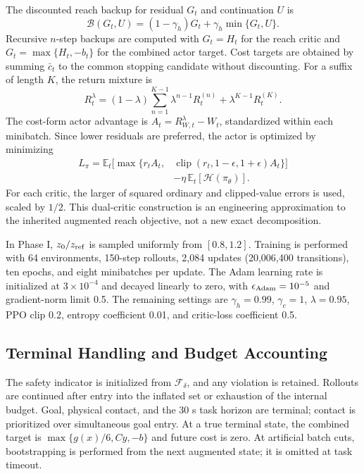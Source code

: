 \documentclass[conference]{IEEEtran}
\begin{document}
The discounted reach backup for residual $G_t$ and continuation $U$ is
\begin{equation}
\mathcal{B}(G_t,U)=(1-\gamma_h)G_t+
\gamma_h\min\{G_t,U\}.
\end{equation}
Recursive $n$-step backups are computed with $G_t=H_t$ for the reach critic and
$G_t=\max\{H_t,-b_t\}$ for the combined actor target. Cost targets are obtained by
summing $\bar c_t$ to the common stopping candidate without discounting. For a
suffix of length $K$, the return mixture is
\begin{equation}
R_t^\lambda=(1-\lambda)\sum_{n=1}^{K-1}\lambda^{n-1}R_t^{(n)}
+\lambda^{K-1}R_t^{(K)}.
\end{equation}
The cost-form actor advantage is $A_t=R_{W,t}^\lambda-W_t$, standardized
within each minibatch. Since lower residuals are preferred, the actor is optimized by minimizing
\begin{equation}
\begin{split}
L_\pi=\mathbb{E}_t\big[\max\{r_t A_t,&
\operatorname{clip}(r_t,1-\epsilon,1+\epsilon)A_t\}\big]\\
&-\eta\,\mathbb{E}_t[\mathcal H(\pi_\theta)] .
\end{split}
\end{equation}
For each critic, the larger of squared ordinary and clipped-value errors is used,
scaled by $1/2$. This dual-critic construction is an engineering approximation
to the inherited augmented reach objective, not a new exact decomposition.

In Phase I, $z_0/z_{\rm ref}$ is sampled uniformly from $[0.8,1.2]$.
Training is performed with 64 environments, 150-step rollouts, 2,084 updates
(20,006,400 transitions), ten epochs, and eight minibatches per update.
The Adam learning rate is initialized at $3\times10^{-4}$ and decayed linearly to zero, with
$\epsilon_{\rm Adam}=10^{-5}$ and gradient-norm limit 0.5.
The remaining settings are $\gamma_h=0.99$, $\gamma_c=1$, $\lambda=0.95$,
PPO clip 0.2, entropy coefficient 0.01, and critic-loss coefficient 0.5.

\subsection{Terminal Handling and Budget Accounting}
\label{app:termination_budget}
The safety indicator is initialized from $\mathcal F_\delta$, and any violation
is retained. Rollouts are continued after entry into the inflated set or exhaustion
of the internal budget. Goal, physical contact, and the 30 s task horizon
are terminal; contact is prioritized over simultaneous goal entry.
At a true terminal state, the combined target is
$\max\{g(x)/6,Cy,-b\}$ and future cost is zero. At artificial batch cuts,
bootstrapping is performed from the next augmented state; it is omitted at task timeout.
\end{document}
